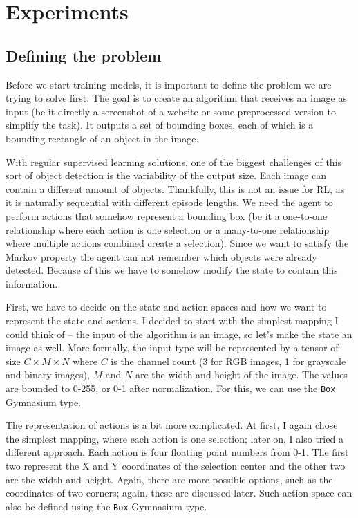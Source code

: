 \documentclass[
  digital,     %
  oneside,     %
  nosansbold,  %
  nocolorbold, %
  lof,         %
  lot,         %
]{fithesis4}
\begin{document}
\chapter{Experiments}

\section{Defining the problem}

Before we start training models, it is important to define the problem we are trying to solve first. The goal is to create an algorithm that receives an image as input (be it directly a screenshot of a website or some preprocessed version to simplify the task). It outputs a set of bounding boxes, each of which is a bounding rectangle of an object in the image.

With regular supervised learning solutions, one of the biggest challenges of this sort of object detection is the variability of the output size. Each image can contain a different amount of objects. Thankfully, this is not an issue for RL, as it is naturally sequential with different episode lengths. We need the agent to perform actions that somehow represent a bounding box (be it a one-to-one relationship where each action is one selection or a many-to-one relationship where multiple actions combined create a selection). Since we want to satisfy the Markov property the agent can not remember which objects were already detected. Because of this we have to somehow modify the state to contain this information.

First, we have to decide on the state and action spaces and how we want to represent the state and actions. I decided to start with the simplest mapping I could think of -- the input of the algorithm is an image, so let's make the state an image as well. More formally, the input type will be represented by a tensor of size $C\times M \times N$ where $C$ is the channel count (3 for RGB images, 1 for grayscale and binary images), $M$ and $N$ are the width and height of the image. The values are bounded to 0-255, or 0-1 after normalization. For this, we can use the \texttt{Box} Gymnasium type.

The representation of actions is a bit more complicated. At first, I again chose the simplest mapping, where each action is one selection; later on, I also tried a different approach. Each action is four floating point numbers from 0-1. The first two represent the X and Y coordinates of the selection center and the other two are the width and height. Again, there are more possible options, such as the coordinates of two corners; again, these are discussed later. Such action space can also be defined using the \texttt{Box} Gymnasium type.
\end{document}
